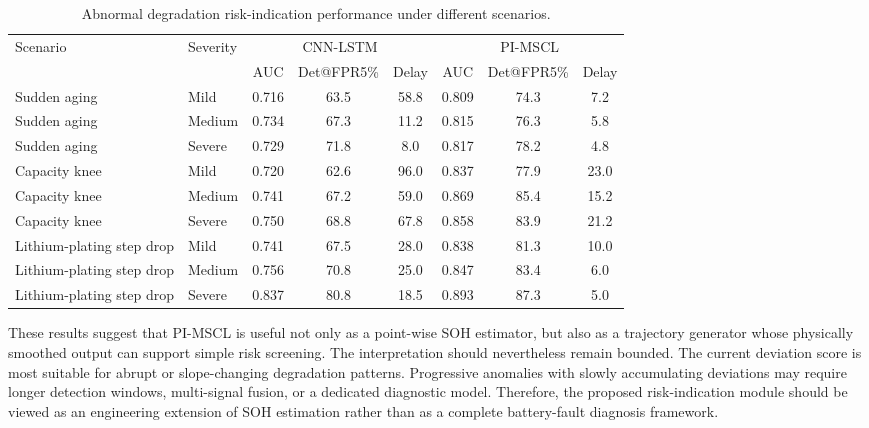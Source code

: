 \begin{table}[t]
\caption{Abnormal degradation risk-indication performance under different scenarios.}
\label{tab:risk_detection}
\centering
\begin{tabular}{llcccccc}
\toprule
Scenario & Severity & \multicolumn{3}{c}{CNN-LSTM} & \multicolumn{3}{c}{PI-MSCL} \\
\cmidrule(lr){3-5}\cmidrule(lr){6-8}
 & & AUC & Det@FPR5\% & Delay & AUC & Det@FPR5\% & Delay \\
\midrule
Sudden aging & Mild & 0.716 & 63.5 & 58.8 & 0.809 & 74.3 & 7.2 \\
Sudden aging & Medium & 0.734 & 67.3 & 11.2 & 0.815 & 76.3 & 5.8 \\
Sudden aging & Severe & 0.729 & 71.8 & 8.0 & 0.817 & 78.2 & 4.8 \\
Capacity knee & Mild & 0.720 & 62.6 & 96.0 & 0.837 & 77.9 & 23.0 \\
Capacity knee & Medium & 0.741 & 67.2 & 59.0 & 0.869 & 85.4 & 15.2 \\
Capacity knee & Severe & 0.750 & 68.8 & 67.8 & 0.858 & 83.9 & 21.2 \\
Lithium-plating step drop & Mild & 0.741 & 67.5 & 28.0 & 0.838 & 81.3 & 10.0 \\
Lithium-plating step drop & Medium & 0.756 & 70.8 & 25.0 & 0.847 & 83.4 & 6.0 \\
Lithium-plating step drop & Severe & 0.837 & 80.8 & 18.5 & 0.893 & 87.3 & 5.0 \\
\bottomrule
\end{tabular}
\end{table}

These results suggest that PI-MSCL is useful not only as a point-wise SOH estimator, but also as a trajectory generator whose physically smoothed output can support simple risk screening. The interpretation should nevertheless remain bounded. The current deviation score is most suitable for abrupt or slope-changing degradation patterns. Progressive anomalies with slowly accumulating deviations may require longer detection windows, multi-signal fusion, or a dedicated diagnostic model. Therefore, the proposed risk-indication module should be viewed as an engineering extension of SOH estimation rather than as a complete battery-fault diagnosis framework.

\fi
